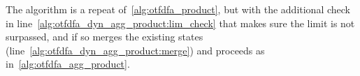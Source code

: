 \documentclass{article}
\begin{document}
The algorithm is a repeat of~\cref{alg:otfdfa_product}, but with the additional check in line~\ref{alg:otfdfa_dyn_agg_product:lim_check} that makes sure the limit is not surpassed, and if so merges the existing states (line~\ref{alg:otfdfa_dyn_agg_product:merge}) and proceeds as in~\cref{alg:otfdfa_agg_product}.



\end{document}
